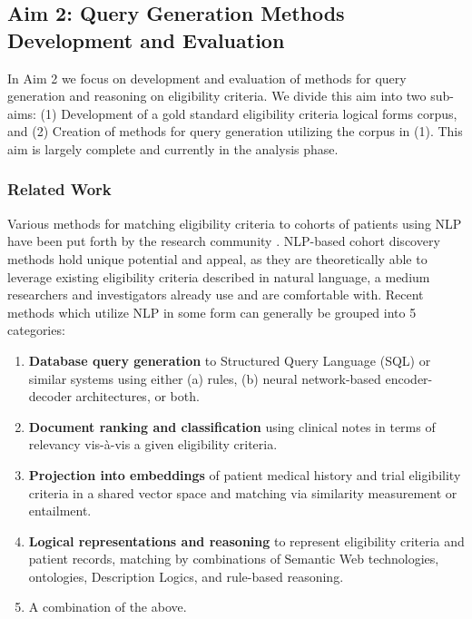 \documentclass[../main.tex]{subfiles}
\begin{document}
\subsection{Aim 2: Query Generation Methods Development and Evaluation}

In Aim 2 we focus on development and evaluation of methods for query generation and reasoning on eligibility criteria. We divide this aim into two sub-aims: (1) Development of a gold standard eligibility criteria logical forms corpus, and (2) Creation of methods for query generation utilizing the corpus in (1). This aim is largely complete and currently in the analysis phase.

\subsubsection{Related Work}

Various methods for matching eligibility criteria to cohorts of patients using NLP have been put forth by the research community \cite{yuan2019criteria2query, soni2020patient, fang2022combining, zhang2020deepenroll, chen2019clinical, patrao2015recruit, dhayne2021emr2vec, liu2021evaluating, xiong2019cohort}. NLP-based cohort discovery methods hold unique potential and appeal, as they are theoretically able to leverage existing eligibility criteria described in natural language, a medium researchers and investigators already use and are comfortable with. Recent methods which utilize NLP in some form can generally be grouped into 5 categories:

\begin{enumerate}
    \item{\textbf{Database query generation} to Structured Query Language (SQL) or similar systems using either (a) rules, (b) neural network-based encoder-decoder architectures}, or both.
    \item{\textbf{Document ranking and classification} using clinical notes in terms of relevancy vis-à-vis a given eligibility criteria.}
    \item{\textbf{Projection into embeddings} of patient medical history and trial eligibility criteria in a shared vector space and matching via similarity measurement or entailment.}
    \item{\textbf{Logical representations and reasoning} to represent eligibility criteria and patient records, matching by combinations of Semantic Web technologies, ontologies, Description Logics, and rule-based reasoning.}
    \item{A combination of the above.}
\end{enumerate}
\end{document}
